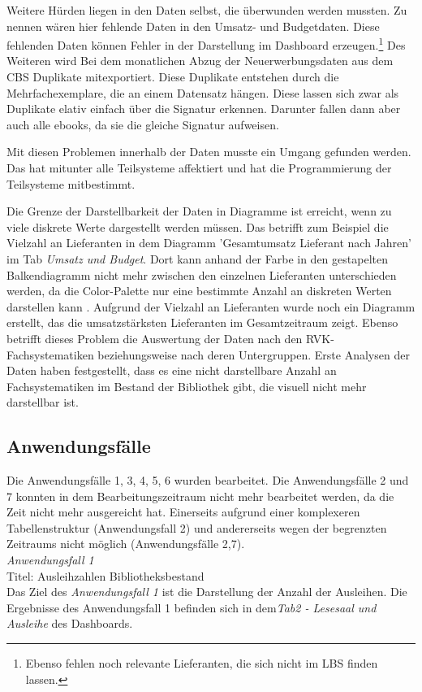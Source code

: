 Weitere Hürden liegen in den Daten selbst, die überwunden werden mussten. Zu nennen wären hier fehlende Daten in den Umsatz- und Budgetdaten.
Diese fehlenden Daten können Fehler in der Darstellung im Dashboard erzeugen.\footnote{Ebenso fehlen noch relevante Lieferanten, die sich nicht im LBS finden lassen.}
Des Weiteren wird Bei dem monatlichen Abzug der Neuerwerbungsdaten aus dem CBS  Duplikate mitexportiert. Diese Duplikate entstehen durch
die Mehrfachexemplare, die an einem Datensatz hängen. Diese lassen sich zwar als Duplikate elativ einfach über die Signatur erkennen.
Darunter fallen dann aber auch alle ebooks, da sie die gleiche Signatur aufweisen.

Mit diesen Problemen innerhalb der Daten musste ein Umgang gefunden werden. Das hat mitunter alle Teilsysteme affektiert und hat
die Programmierung der Teilsysteme mitbestimmt.

Die Grenze der Darstellbarkeit der Daten in Diagramme ist erreicht, wenn zu viele diskrete Werte dargestellt werden müssen.
Das betrifft zum Beispiel die Vielzahl an Lieferanten in dem Diagramm 'Gesamtumsatz Lieferant nach Jahren' im Tab \textit{Umsatz und Budget}. Dort kann anhand der Farbe in den gestapelten Balkendiagramm
nicht mehr zwischen den einzelnen Lieferanten unterschieden werden, da die Color-Palette nur eine bestimmte Anzahl an diskreten Werten darstellen kann \cite[Vgl.][]{plotly_discrete_2021}.
Aufgrund der Vielzahl an Lieferanten wurde noch ein Diagramm erstellt, das die umsatzstärksten Lieferanten
im Gesamtzeitraum zeigt. Ebenso betrifft dieses Problem die Auswertung der Daten nach den RVK-Fachsystematiken beziehungsweise nach deren Untergruppen. 
Erste Analysen der Daten haben festgestellt, dass es eine nicht darstellbare Anzahl an Fachsystematiken im Bestand der Bibliothek gibt, die visuell nicht mehr darstellbar ist.

\subsection{Anwendungsfälle}
Die Anwendungsfälle 1, 3, 4, 5, 6 wurden bearbeitet.
Die Anwendungsfälle 2 und 7 konnten in dem Bearbeitungszeitraum nicht mehr bearbeitet werden, 
da die Zeit nicht mehr ausgereicht hat. Einerseits aufgrund einer komplexeren Tabellenstruktur (Anwendungsfall 2) und andererseits wegen
der begrenzten Zeitraums nicht möglich (Anwendungsfälle 2,7).\\


\noindent
\textit{Anwendungsfall 1}\\
Titel: Ausleihzahlen Bibliotheksbestand\\
Das Ziel des \textit{Anwendungsfall 1} ist die Darstellung der Anzahl der Ausleihen.
Die Ergebnisse des Anwendungsfall 1 befinden sich in dem\textit{Tab2 - Lesesaal und Ausleihe} des Dashboards.


